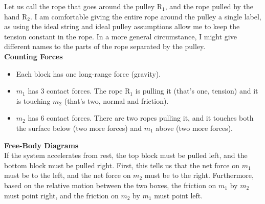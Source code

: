 \documentclass[]{article}
\begin{document}
\begin{TeacherMargin}
\noindent Let us call the rope that goes around the pulley R$_{1}$, and the rope pulled by the hand R$_{2}$. I am comfortable giving the entire rope around the pulley a single label, as using the ideal string and ideal pulley assumptions allow me to keep the tension constant in the rope. In a more general circumstance, I might give different names to the parts of the rope separated by the pulley. \\
\textbf{Counting Forces}
\begin{itemize}
	\item Each block has one long-range force (gravity).
	\item $m_{1}$ has 3 contact forces. The rope R$_{1}$ is pulling it (that's one, tension) and it is touching $m_{2}$ (that's two, normal and friction).
	\item $m_{2}$ has 6 contact forces. There are two ropes pulling it, and it touches both the surface below (two more forces) and $m_{1}$ above (two more forces).
\end{itemize}
\textbf{Free-Body Diagrams} \\
If the system accelerates from rest, the top block must be pulled left, and the bottom block must be pulled right. First, this tells us that the net force on $m_{1}$ must be to the left, and the net force on $m_{2}$ must be to the right. Furthermore, based on the relative motion between the two boxes, the friction on $m_{1}$ by $m_{2}$ must point right, and the friction on $m_{2}$ by $m_{1}$ must point left.
\begin{center}
\end{center}
\end{TeacherMargin}
\end{document}
